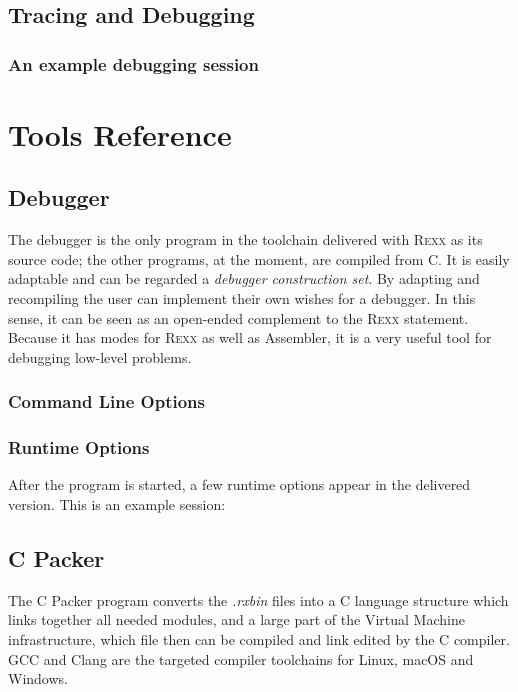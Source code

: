     \chapter{Tracing and Debugging}
    \section{An example debugging session}

\part{Tools Reference}




\chapter{\crexx{} Debugger}\label{debugger}
The debugger is the only program in the toolchain delivered with \textsc{Rexx}
as its source code; the other programs, at the moment, are compiled
from C. It is easily adaptable and can be regarded a \emph{debugger
  construction set}. By adapting and recompiling the user can
implement their own wishes for a debugger. In this sense, it can be
seen as an open-ended complement to the \textsc{Rexx} 
statement. Because it has modes for \textsc{Rexx} as well as
 Assembler, it is a very useful tool for debugging
low-level problems.
\section{Command Line Options}
\begin{shaded}
  \small
  \obeylines {}
 \end{shaded}
\section{Runtime Options}
After the  program is started, a few runtime options appear in the
delivered version. This is an example session:
\chapter{\crexx{} C Packer}
The C Packer program converts the \emph{.rxbin} files into a C
language structure which links together all needed modules, and a
large part of the Virtual Machine infrastructure, which file then can
be compiled and link edited by the C compiler. GCC and Clang are the
targeted compiler toolchains for Linux, macOS and Windows.
